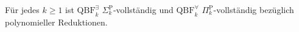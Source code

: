 \begin{Theorem}
    \label{thm:qbf-ph-completeness}
    Für jedes \(k\geq 1\) ist
    \(\mathrm{QBF}^{\exists}_k\)
    \(\Sigma_k^{\mathrm{P}}\)-vollständig und
    \(\mathrm{QBF}^{\forall}_k\)
    \(\Pi_k^{\mathrm{P}}\)-vollständig bezüglich polynomieller
    Reduktionen.
\end{Theorem}
